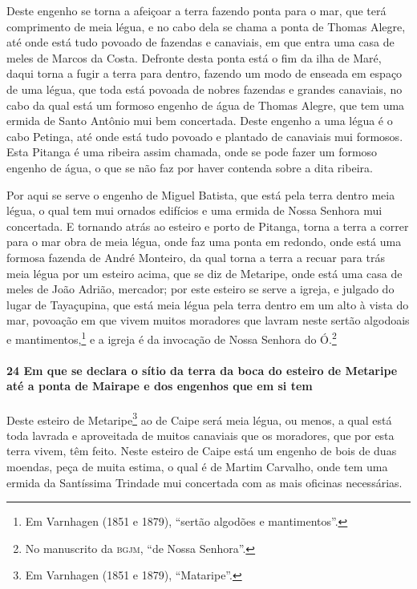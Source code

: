 Deste engenho se torna a afeiçoar a terra fazendo ponta para o mar, que terá comprimento
de meia légua, e no cabo dela se chama a ponta de Thomas Alegre, até onde está tudo
povoado de fazendas e canaviais, em que entra uma casa de meles de Marcos da Costa.
Defronte desta ponta está o fim da ilha de Maré, daqui torna a fugir a terra para dentro,
fazendo um modo de enseada em espaço de uma légua, que toda está povoada de nobres
fazendas e grandes canaviais, no cabo da qual está um formoso engenho de água de Thomas
Alegre, que tem uma ermida de Santo Antônio mui bem concertada. Deste engenho a uma légua
é o cabo Petinga, até onde está tudo povoado e plantado de canaviais mui formosos. Esta
Pitanga é uma ribeira assim chamada, onde se pode fazer um formoso engenho de água, o que
se não faz por haver contenda sobre a dita ribeira.

Por aqui se serve o engenho de Miguel Batista, que está pela terra dentro meia légua, o
qual tem mui ornados edifícios e uma ermida de Nossa Senhora mui concertada. E tornando
atrás ao esteiro e porto de Pitanga, torna a terra a correr para o mar obra de meia légua,
onde faz uma ponta em redondo, onde está uma formosa fazenda de André Monteiro, da qual
torna a terra a recuar para trás meia légua por um esteiro acima, que se diz de Metaripe,
onde está uma casa de meles de João Adrião, mercador; por este esteiro se serve a igreja,
e julgado do lugar de Tayaçupina, que está meia légua pela terra dentro em um alto à vista
do mar, povoação em que vivem muitos moradores que lavram neste sertão algodoais e
mantimentos,\footnote{ Em Varnhagen (1851 e 1879), ``sertão algodões e mantimentos''.} e a
igreja é da invocação de Nossa Senhora do Ó.\footnote{ No manuscrito da \textsc{bgjm}, ``de
Nossa Senhora''.}

\paragraph{24 Em que se declara o sítio da terra da boca do esteiro de Metaripe até a
ponta de Mairape e dos engenhos que em si tem}

Deste esteiro de Metaripe\footnote{ Em Varnhagen (1851 e 1879), ``Mataripe''.} ao de Caipe
será meia légua, ou menos, a qual está toda lavrada e aproveitada de muitos canaviais que
os moradores, que por esta terra vivem, têm feito. Neste esteiro de Caipe está um engenho
de bois de duas moendas, peça de muita estima, o qual é de Martim Carvalho, onde tem uma
ermida da Santíssima Trindade mui concertada com as mais oficinas necessárias.

